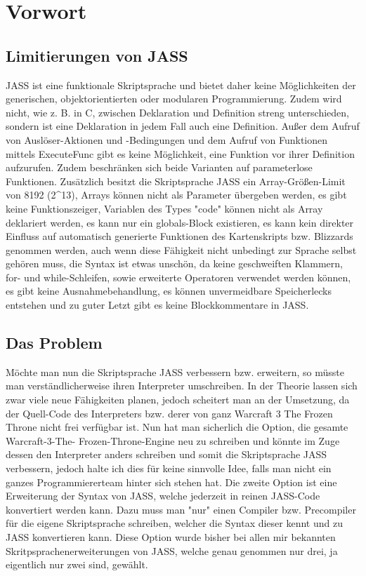 \chapter { Vorwort }

\section { Limitierungen von JASS }
JASS ist eine funktionale Skriptsprache und bietet daher keine Möglichkeiten der generischen, objektorientierten
oder modularen Programmierung. Zudem wird nicht, wie z. B. in C, zwischen Deklaration und Definition streng unterschieden,
sondern ist eine Deklaration in jedem Fall auch eine Definition.
Außer dem Aufruf von Auslöser-Aktionen und -Bedingungen und dem Aufruf von Funktionen mittels ExecuteFunc gibt es keine
Möglichkeit, eine Funktion vor ihrer Definition aufzurufen. Zudem beschränken sich beide Varianten auf parameterlose
Funktionen.
Zusätzlich besitzt die Skriptsprache JASS ein Array-Größen-Limit von 8192 (2^13), Arrays können nicht als Parameter
übergeben werden, es gibt keine Funktionszeiger, Variablen des Types "code" können nicht als Array deklariert werden,
es kann nur ein globals-Block existieren, es kann kein direkter Einfluss auf automatisch generierte Funktionen
des Kartenskripts bzw. Blizzards genommen werden, auch wenn diese Fähigkeit nicht unbedingt zur Sprache selbst gehören muss,
die Syntax ist etwas unschön, da keine geschweiften Klammern, for- und while-Schleifen, sowie erweiterte Operatoren verwendet
werden können, es gibt keine Ausnahmebehandlung, es können unvermeidbare Speicherlecks entstehen und zu guter Letzt
gibt es keine Blockkommentare in JASS.

\section { Das Problem }
Möchte man nun die Skriptsprache JASS verbessern bzw. erweitern, so müsste man verständlicherweise ihren Interpreter umschreiben.
In der Theorie lassen sich zwar viele neue Fähigkeiten planen, jedoch scheitert man an der Umsetzung, da der Quell-Code des Interpreters
bzw. derer von ganz Warcraft 3 The Frozen Throne nicht frei verfügbar ist. Nun hat man sicherlich die Option, die gesamte Warcraft-3-The-
Frozen-Throne-Engine neu zu schreiben und könnte im Zuge dessen den Interpreter anders schreiben und somit die Skriptsprache JASS verbessern,
jedoch halte ich dies für keine sinnvolle Idee, falls man nicht ein ganzes Programmiererteam hinter sich stehen hat.
Die zweite Option ist eine Erweiterung der Syntax von JASS, welche jederzeit in reinen JASS-Code konvertiert werden kann.
Dazu muss man "nur" einen Compiler bzw. Precompiler für die eigene Skriptsprache schreiben, welcher die Syntax dieser kennt und zu JASS konvertieren
kann.
Diese Option wurde bisher bei allen mir bekannten Skritpsprachenerweiterungen von JASS, welche genau genommen nur drei, ja eigentlich nur zwei sind, gewählt.

